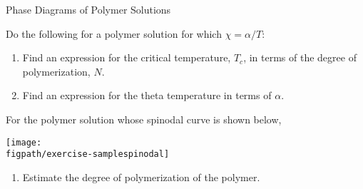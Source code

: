 \begin{activity}{Phase Diagrams of Polymer Solutions}
\begin{exercises}
\begin{enumerate}
				
		\end{enumerate}
		
	\exercise Do the following for a polymer solution for which $\chi = \alpha/T$:
		
		\begin{enumerate}
			\item Find an expression for the critical temperature, $T_c$, in terms of the degree of polymerization, $N$.
			
				\begin{solution}\end{solution}
				
			\item Find an expression for the theta temperature  in terms of $\alpha$.
			
				\begin{solution}\end{solution}
				
		\end{enumerate}
		
	\exercise For the polymer solution whose spinodal curve is shown below,
	
		\centerline{\texttt{[image: \\figpath/exercise-samplespinodal]}}
	
		\begin{enumerate}
			\item Estimate the degree of polymerization of the polymer.
				

\end{enumerate}
\end{exercises}
\end{activity}
